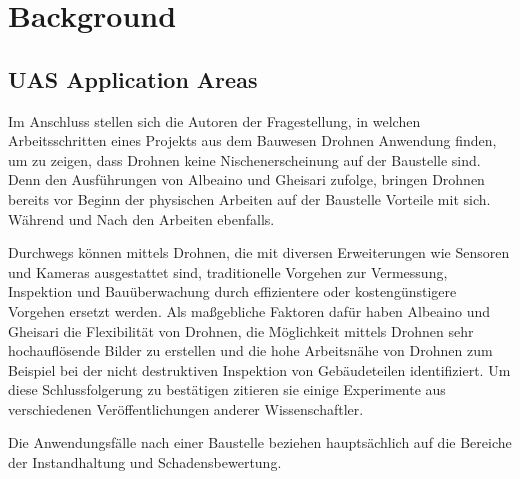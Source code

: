 
\section{Background}
\subsection{UAS Application Areas}
Im Anschluss stellen sich die Autoren der Fragestellung, in welchen Arbeitsschritten eines Projekts aus dem Bauwesen Drohnen Anwendung finden, um zu zeigen, dass Drohnen keine Nischenerscheinung auf der Baustelle sind.
Denn den Ausführungen von Albeaino und Gheisari zufolge, bringen Drohnen bereits vor Beginn der physischen Arbeiten auf der Baustelle Vorteile mit sich.
Während und Nach den Arbeiten ebenfalls. \cite[S. 86]{abaeano2021trends}

Durchwegs können mittels Drohnen, die mit diversen Erweiterungen wie Sensoren und Kameras ausgestattet sind, traditionelle Vorgehen zur Vermessung, Inspektion und Bauüberwachung durch effizientere oder kostengünstigere Vorgehen ersetzt werden.
Als maßgebliche Faktoren dafür haben Albeaino und Gheisari die Flexibilität von Drohnen, die Möglichkeit mittels Drohnen sehr hochauflösende Bilder zu erstellen und die hohe Arbeitsnähe von Drohnen zum Beispiel bei der nicht destruktiven Inspektion von Gebäudeteilen identifiziert.
Um diese Schlussfolgerung zu bestätigen zitieren sie einige Experimente aus verschiedenen Veröffentlichungen anderer Wissenschaftler. \cite[S. 87--88]{abaeano2021trends}

Die Anwendungsfälle nach einer Baustelle beziehen hauptsächlich auf die Bereiche der Instandhaltung und Schadensbewertung. \cite[S. 89]{abaeano2021trends}



